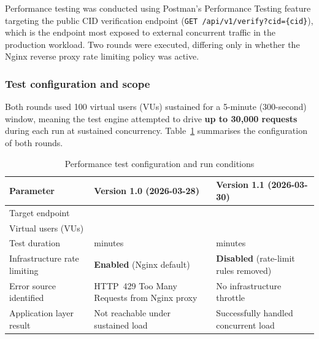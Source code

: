Performance testing was conducted using Postman's Performance Testing feature
targeting the public CID verification endpoint
(\texttt{GET /api/v1/verify?cid=\{cid\}}), which is the endpoint most
exposed to external concurrent traffic in the production workload.  Two
rounds were executed, differing only in whether the Nginx reverse proxy
rate limiting policy was active.

\subsubsection{Test configuration and scope}

Both rounds used 100 virtual users (VUs) sustained for a 5-minute (300-second)
window, meaning the test engine attempted to drive \textbf{up to 30,000
requests} during each run at sustained concurrency.
Table~\ref{tab:perf-config-detail} summarises the configuration of both rounds.

\begin{table}[H]
  \vspace{2ex}
  \centering
  \footnotesize
  {%
  \setlength{\tabcolsep}{6pt}
  \renewcommand{\arraystretch}{1.3}
  \begin{tabular}{|>{\raggedright\arraybackslash}p{}|
                  >{\centering\arraybackslash}p{}|
                  >{\centering\arraybackslash}p{}|}
    \hline
    \textbf{Parameter} & \textbf{Version 1.0 (2026-03-28)} & \textbf{Version 1.1 (2026-03-30)} \\
    \hline\hline
    Target endpoint & \multicolumn{2}{c|}{\texttt{GET /api/v1/verify?cid=\{cid\}}} \\
    \hline
    Virtual users (VUs) & 100 & 100 \\
    \hline
    Test duration & 5 minutes & 5 minutes \\
    \hline
    Infrastructure rate limiting & \textbf{Enabled} (Nginx default) & \textbf{Disabled} (rate-limit rules removed) \\
    \hline
    Error source identified & HTTP~429 Too Many Requests from Nginx proxy & No infrastructure throttle \\
    \hline
    Application layer result & Not reachable under sustained load & Successfully handled concurrent load \\
    \hline
  \end{tabular}
  }%
  \vspace{2ex}
  \captionsetup{type=table}
  \caption{Performance test configuration and run conditions}
  \label{tab:perf-config-detail}
\end{table}

